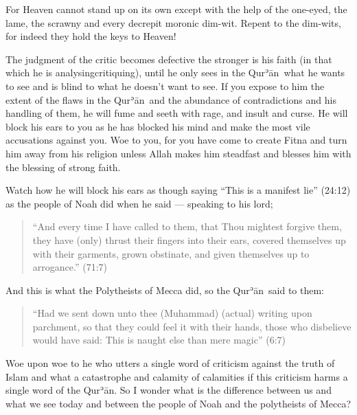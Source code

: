 \documentclass[12pt]{memoir}
\def\´{ʾ} %
\def \Quran{Qur\-\´ān} %
\def\/{\discretionary{/}{}{/}}
\newcommand{\QRef}[1]{{\color{darkblue}#1}}
\let \fnmark=\footnotemark
\begin{document}
For Heaven cannot stand up on its own except with the help of the one-eyed,
the lame, the scrawny and every decrepit moronic dim-wit.
Repent to the dim-wits, for indeed they hold the keys to Heaven!

The judgment of the critic becomes defective the stronger is his faith
(in that which he is analysing\/critiquing),
until he only sees in the \Quran\ what he wants to see
and is blind to what he doesn’t want to see.
If you expose to him the extent of the flaws in the \Quran\
and the abundance of contradictions and his handling of them,
he will fume and seeth with rage, and insult and curse.
He will block his ears to you as he has blocked his mind
and make the most vile accusations against you.
Woe to you, for you have come to create Fitna
and turn him away from his religion unless Allah makes him
steadfast and blesses him with the blessing of strong faith.

Watch how he will block his ears as though saying “This is a manifest lie”
(\QRef{24:12}) as the people of Noah did when he said — speaking to his lord;

\begin{quote}
“And every time I have called to them, that Thou mightest forgive them,
they have (only) thrust their fingers into their ears,
covered themselves up with their garments, grown obstinate,
and given themselves up to arrogance.” (\QRef{71:7})
\end{quote}

And this is what the Polytheists of Mecca did, so the \Quran\ said to them:

\begin{quote}
“Had we sent down unto thee (Muhammad) (actual) writing upon parchment,
so that they could feel it with their hands,
those who disbelieve would have said:
This is naught else than mere magic” (\QRef{6:7})
\end{quote}

Woe upon woe to he who utters a single word of criticism against
the truth of Islam and what a catastrophe and calamity of calamities
if this criticism harms a single word of the \Quran.
So I wonder what is the difference between us and what we see today
and between the people of Noah and the polytheists of Mecca?\fnmark
\end{document}
